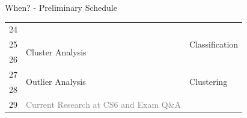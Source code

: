 \begin{frame}{When? - Preliminary Schedule}
\begin{tabular}{|p{4em}|p{25em}|p{21em}|}
		\cellcolor{faugray!25}24                    &                                                                                              & \multirow{3}{*}{Classification}                              \\ \hhline{|-|-|~|}
		\cellcolor{faugray!25}25                    & \multirow{2}{*}{Cluster Analysis}                                                            &                                                              \\ \hhline{|-|~|}
		\cellcolor{faugray!25}26                    &                                                                                              &                                                              \\ \hline
		\cellcolor{faugray!25}27                    & \multirow{2}{*}{Outlier Analysis}                                                            & \multirow{2}{*}{Clustering}                                  \\ \hhline{|-|~|}
		\cellcolor{faugray!25}28                    &                                                                                              &                                                              \\ \hline
		\cellcolor{faugray!25}29                    & \textcolor{gray}{Current Research at CS6 and Exam Q\&A}                                      & \cellcolor{gray!50}                                          \\ \hline
	\end{tabular}
\end{frame}

